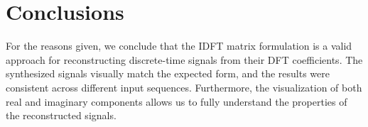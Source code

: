 \documentclass[12pt]{article}
\begin{document}
\section{Conclusions}

For the reasons given, we conclude that the IDFT matrix formulation is a valid approach for reconstructing discrete-time signals from their DFT coefficients. The synthesized signals visually match the expected form, and the results were consistent across different input sequences. Furthermore, the visualization of both real and imaginary components allows us to fully understand the properties of the reconstructed signals.
\end{document}
